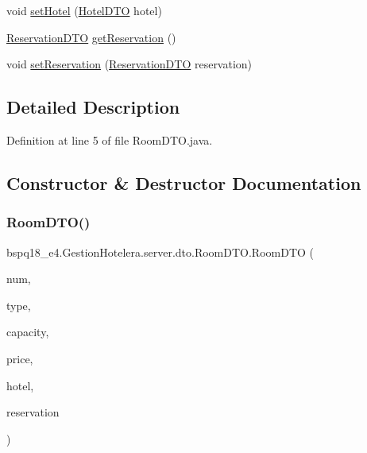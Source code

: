 \begin{DoxyCompactItemize}
void \mbox{\hyperlink{classbspq18__e4_1_1_gestion_hotelera_1_1server_1_1dto_1_1_room_d_t_o_ae64b2b805842dedab21f348110489a6b}{set\+Hotel}} (\mbox{\hyperlink{classbspq18__e4_1_1_gestion_hotelera_1_1server_1_1dto_1_1_hotel_d_t_o}{Hotel\+D\+TO}} hotel)
\item 
\mbox{\hyperlink{classbspq18__e4_1_1_gestion_hotelera_1_1server_1_1dto_1_1_reservation_d_t_o}{Reservation\+D\+TO}} \mbox{\hyperlink{classbspq18__e4_1_1_gestion_hotelera_1_1server_1_1dto_1_1_room_d_t_o_a5472b04e2d8b8657ce64d701f704615c}{get\+Reservation}} ()
\item 
void \mbox{\hyperlink{classbspq18__e4_1_1_gestion_hotelera_1_1server_1_1dto_1_1_room_d_t_o_ac88699016115b5cb8a7ac515eddaad54}{set\+Reservation}} (\mbox{\hyperlink{classbspq18__e4_1_1_gestion_hotelera_1_1server_1_1dto_1_1_reservation_d_t_o}{Reservation\+D\+TO}} reservation)
\end{DoxyCompactItemize}


\subsection{Detailed Description}


Definition at line 5 of file Room\+D\+T\+O.\+java.



\subsection{Constructor \& Destructor Documentation}
\mbox{\label{classbspq18__e4_1_1_gestion_hotelera_1_1server_1_1dto_1_1_room_d_t_o_a3347f4ea4138cbd19f86d952272abcb9}} 
\subsubsection{\texorpdfstring{Room\+D\+T\+O()}{RoomDTO()}}
{\footnotesize\ttfamily bspq18\+\_\+e4.\+Gestion\+Hotelera.\+server.\+dto.\+Room\+D\+T\+O.\+Room\+D\+TO (\begin{DoxyParamCaption}\item[{int}]{num,  }\item[{String}]{type,  }\item[{int}]{capacity,  }\item[{double}]{price,  }\item[{\mbox{\hyperlink{classbspq18__e4_1_1_gestion_hotelera_1_1server_1_1dto_1_1_hotel_d_t_o}{Hotel\+D\+TO}}}]{hotel,  }\item[{\mbox{\hyperlink{classbspq18__e4_1_1_gestion_hotelera_1_1server_1_1dto_1_1_reservation_d_t_o}{Reservation\+D\+TO}}}]{reservation }\end{DoxyParamCaption})}



